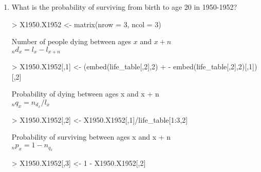 \documentclass{article}
\begin{document}
\begin{enumerate}
  \item What is the probability of surviving from birth to age 20 in 1950-1952?
\begin{Schunk}
\begin{Sinput}
> X1950.X1952 <- matrix(nrow = 3, ncol = 3)
\end{Sinput}
\end{Schunk}

Number of people dying between ages \(x\) and \(x + n\)\\
\(_nd_x = l_x - l_{x+n}\)
\begin{Schunk}
\begin{Sinput}
> X1950.X1952[,1] <- (embed(life_table[,2],2) 
+                     - embed(life_table[,2],2)[,1])[,2]
\end{Sinput}
\end{Schunk}
Probability of dying between ages x and x + n\\
\(_nq_x = n_d_x/l_x\)
\begin{Schunk}
\begin{Sinput}
> X1950.X1952[,2] <- X1950.X1952[,1]/life_table[1:3,2]
\end{Sinput}
\end{Schunk}
Probability of surviving between ages x and x + n\\
\(_np_x = 1 - n_q_x\)
\begin{Schunk}
\begin{Sinput}
> X1950.X1952[,3] <- 1 - X1950.X1952[,2]
\end{Sinput}
\end{Schunk}


\end{enumerate}
\end{document}
